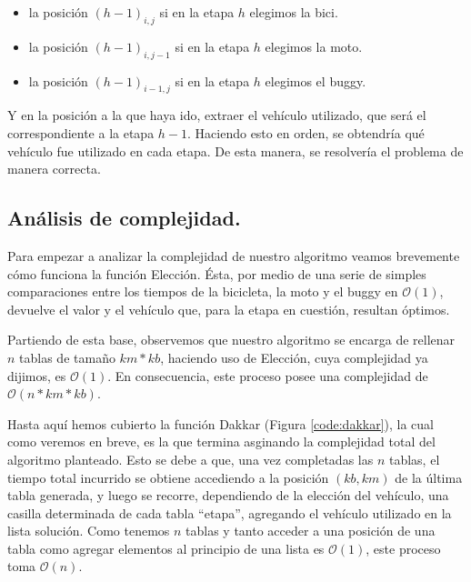 \begin{itemize}
	\item la posición $(h-1)_{i,j}$ si en la etapa $h$ elegimos la bici.
	\item la posición $(h-1)_{i,j-1}$ si en la etapa $h$ elegimos la moto.
	\item la posición $(h-1)_{i-1,j}$ si en la etapa $h$ elegimos el buggy.
\end{itemize}			

	 Y en la posición a la que haya ido, extraer el vehículo utilizado, que será el correspondiente a la etapa $h-1$. Haciendo esto en orden, se obtendría qué vehículo fue utilizado en cada etapa. De esta manera, se resolvería el problema de manera correcta.
 
\vspace*{0.6cm}


\subsection{Análisis de complejidad.}

\vspace*{0.3cm}

Para empezar a analizar la complejidad de nuestro algoritmo veamos brevemente cómo funciona la función {\sc Elección}. Ésta, por medio de una serie de simples comparaciones entre los tiempos de la bicicleta, la moto y el buggy en $\mathcal{O}(1)$, devuelve el valor y el vehículo que, para la etapa en cuestión, resultan óptimos.

Partiendo de esta base, observemos que nuestro algoritmo se encarga de rellenar $n$ tablas de tamaño $km*kb$, haciendo uso de {\sc Elección}, cuya complejidad ya dijimos, es $\mathcal{O}(1)$. En consecuencia, este proceso posee una complejidad de $\mathcal{O}(n*km*kb)$.

Hasta aquí hemos cubierto la función {\sc Dakkar} (Figura \ref{code:dakkar}), la cual como veremos en breve, es la que termina asginando la complejidad total del algoritmo planteado. Esto se debe a que, una vez completadas las $n$ tablas, el tiempo total incurrido se obtiene accediendo a la posición $(kb,km)$ de la última tabla generada, y luego se recorre, dependiendo de la elección del vehículo, una casilla determinada de cada tabla ``etapa'', agregando el vehículo utilizado en la lista solución. Como tenemos $n$ tablas y tanto acceder a una posición de una tabla como agregar elementos al principio de una lista es $\mathcal{O}(1)$, este proceso toma $\mathcal{O}(n)$.

